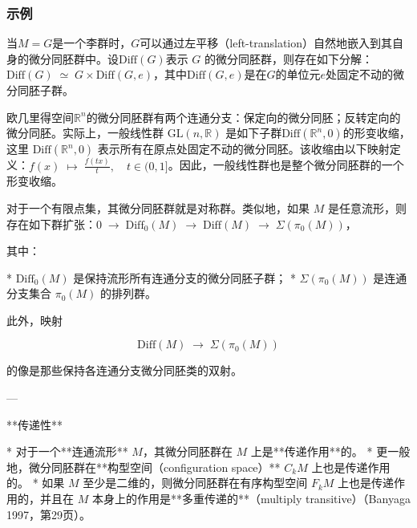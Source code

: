 \subsubsection{示例}

当$M = G$是一个李群时，$G$可以通过\*\*左平移（left-translation）\*\*自然地嵌入到其自身的微分同胚群中。设$\text{Diff}(G)$表示 $G$ 的微分同胚群，则存在如下分解：$\text{Diff}(G) \;\simeq\; G \times \text{Diff}(G, e)$，其中$\text{Diff}(G, e)$是在$G$的单位元$e$处固定不动的微分同胚子群。


欧几里得空间$\mathbb{R}^n$的微分同胚群有两个连通分支：保定向的微分同胚；反转定向的微分同胚。实际上，一般线性群 $\text{GL}(n, \mathbb{R})$ 是如下子群$
\text{Diff}(\mathbb{R}^n, 0)$的形变收缩，这里 $\text{Diff}(\mathbb{R}^n, 0)$ 表示所有在原点处固定不动的微分同胚。该收缩由以下映射定义：$f(x) \;\mapsto\; \frac{f(tx)}{t}, \quad t \in (0, 1]$。因此，一般线性群也是整个微分同胚群的一个形变收缩。

对于一个有限点集，其微分同胚群就是对称群。类似地，如果 $M$ 是任意流形，则存在如下群扩张：$0 \;\longrightarrow\; \text{Diff}_0(M)\;\longrightarrow\; \text{Diff}(M)\;\longrightarrow\; \Sigma(\pi_0(M))，$

  其中：

  * $\text{Diff}_0(M)$ 是保持流形所有连通分支的微分同胚子群；
  * $\Sigma(\pi_0(M))$ 是连通分支集合 $\pi_0(M)$ 的排列群。

  此外，映射

  $$
  \text{Diff}(M) \;\to\; \Sigma(\pi_0(M))
  $$

  的像是那些保持各连通分支微分同胚类的双射。

---

**传递性**

* 对于一个**连通流形** $M$，其微分同胚群在 $M$ 上是**传递作用**的。
* 更一般地，微分同胚群在**构型空间（configuration space）** $C_kM$ 上也是传递作用的。
* 如果 $M$ 至少是二维的，则微分同胚群在有序构型空间 $F_kM$ 上也是传递作用的，并且在 $M$ 本身上的作用是**多重传递的**（multiply transitive）（Banyaga 1997，第29页）。
